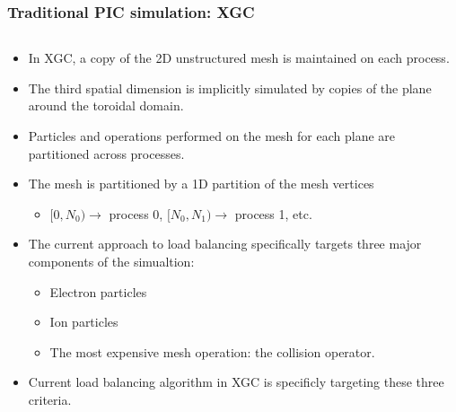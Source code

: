 \documentclass[aspectratio=169]{beamer}
\begin{document}
\begin{frame}
  \frametitle{Traditional PIC simulation: XGC}
  \begin{columns}
    \begin{column}{.7\textwidth}
      \begin{itemize}
      \item In XGC, a copy of the 2D unstructured mesh is maintained on each process.
      \item The third spatial dimension is implicitly simulated by copies of the plane around the toroidal domain.
      \item Particles and operations performed on the mesh for each plane are partitioned
        across processes.
      \item The mesh is partitioned by a 1D partition of the mesh vertices
        \begin{itemize}
        \item $[0, N_0) \rightarrow$ process 0, $[N_0, N_1) \rightarrow$ process 1, etc.
        \end{itemize}
      \item The current approach to load balancing specifically targets three major components of the simualtion:
        \begin{itemize}
        \item Electron particles
        \item Ion particles
        \item The most expensive mesh operation: the collision operator.
        \end{itemize}
      \item Current load balancing algorithm in XGC is specificly targeting these three criteria.
      \end{itemize}
    \end{column}


\end{columns}
\end{frame}
\end{document}
